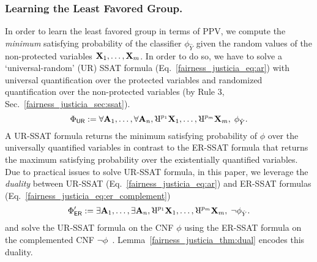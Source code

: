\subsubsection{Learning the Least Favored Group.}
In order to learn the least favored group in terms of PPV, we  compute the \textit{minimum} satisfying probability of the classifier $ \phi_{\hat{Y}} $ given the random values of the non-protected variables $ \mathbf{X}_1, \dots, \mathbf{X}_m $. In order to do so, we have to solve a `universal-random' (UR) SSAT formula (Eq.~\eqref{fairness_justicia_eq:ar}) with  universal quantification over the protected variables and randomized quantification over the non-protected variables (by Rule 3, Sec.~\ref{fairness_justicia_sec:ssat}).
\begin{equation}
\Phi_{\mathsf{UR}} := \forall \sensitive_1,\dots, \forall \sensitive_n,
\R^{p_{1}}\nonsensitive_1, \dots, \R^{p_{m}}\nonsensitive_m,   \; \phi_{\hat{Y}}.
\label{fairness_justicia_eq:ar}
\end{equation}
A UR-SSAT formula returns the minimum satisfying probability of $ \phi $ over the universally quantified variables in contrast to the ER-SSAT formula that returns the maximum satisfying  probability over the existentially quantified variables.  
Due to practical issues to solve UR-SSAT formula, in this paper, we leverage the \textit{duality} between UR-SSAT (Eq.~\eqref{fairness_justicia_eq:ar}) and ER-SSAT formulas (Eq.~\eqref{fairness_justicia_eq:er_complement}) 
\begin{equation}
\Phi'_{\mathsf{ER}} := \exists \sensitive_1,\dots, \exists \sensitive_n,
\R^{p_{1}}\nonsensitive_1, \dots, \R^{p_{m}}\nonsensitive_m,   \; \neg \phi_{\hat{Y}}.
\label{fairness_justicia_eq:er_complement}
\end{equation}
and solve the UR-SSAT formula on the CNF $ \phi $ using the ER-SSAT formula on the complemented CNF $ \neg \phi $~\cite{littman2001stochastic}. Lemma~\ref{fairness_justicia_thm:dual} encodes this duality.
